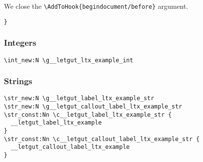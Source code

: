 \documentclass{letgut}
\begin{document}
We close the \lstinline+\AddToHook{begindocument/before}+ argument.

\begin{lstlisting}
}
\end{lstlisting}

\subsubsection{Integers}
\label{ImplementationDeclarationsIntegers-7pag55h0jlj0}
\begin{lstlisting}
\int_new:N \g__letgut_ltx_example_int
\end{lstlisting}

\subsubsection{Strings}
\label{ImplementationDeclarationsStrings-t7bg55h0jlj0}
\begin{lstlisting}
\str_new:N \g__letgut_label_ltx_example_str
\str_new:N \g__letgut_callout_label_ltx_example_str
\str_const:Nn \c__letgut_label_ltx_example_str {
  __letgut_label_ltx_example
}
\str_const:Nn \c__letgut_callout_label_ltx_example_str {
  __letgut_callout_label_ltx_example
}
\end{lstlisting}
\end{document}
